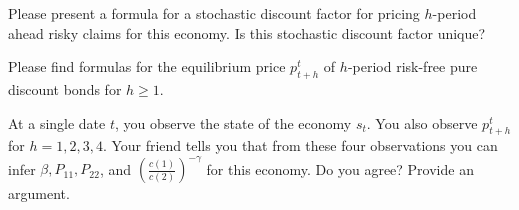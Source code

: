 \medskip
{} Please present a formula for a stochastic discount factor for pricing $h$-period ahead risky claims for this economy.
Is this stochastic discount factor unique?

\medskip
{}  Please find formulas for the equilibrium  price $p^t_{t+h}$  of $h$-period  risk-free pure discount bonds for $h \geq 1$.


\medskip
{}  At a single date  $t$, you observe the state of  the economy $s_t$. You also observe $p^t_{t+h}$ for $h=1,2,3,4$.
Your friend tells you that from these four observations you can infer $\beta, P_{11}, P_{22}$, and $\left({\frac{c(1)}{c(2)}}\right)^{-\gamma}$ for this economy.
Do you agree?  Provide an argument.






\eqnotracefalse
